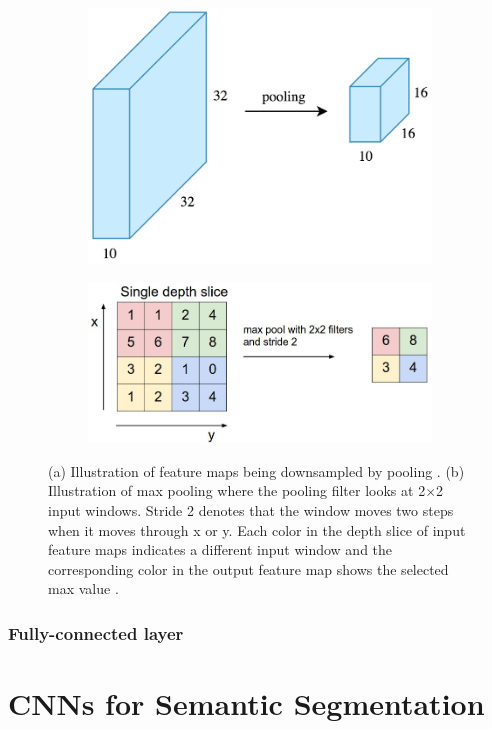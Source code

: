 	\begin{figure}[h]
	\centering
		\begin{subfigure}{.35\textwidth}
  			\centering
  			\includegraphics[width=1\linewidth]{images/pooling}
  			\caption{}
  			\label{Fig:poolb}
		\end{subfigure}
		\begin{subfigure}{.55\textwidth}
  			\centering
  			\includegraphics[width=1\linewidth]{images/maxpool}
  			\caption{}
  			\label{Fig:poola}
		\end{subfigure}
		\caption{(a) Illustration of feature maps being downsampled by pooling \cite{towardsdatascience}. (b) Illustration of max pooling where the pooling filter looks at 2$\times$2 input windows. Stride 2 denotes that the window moves two steps when it moves through x or y. Each color in the depth slice of input feature maps indicates a different input window and the corresponding color in the output feature map shows the selected max value \cite{cs231n}.}
		\label{Fig:pool}
	\end{figure}	


\subsubsection{Fully-connected layer}

\section{CNNs for Semantic Segmentation}

